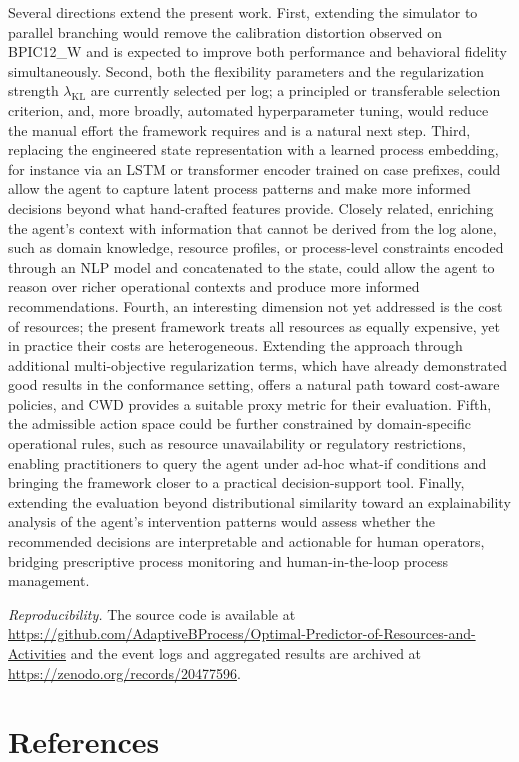 \documentclass[journal,onecolumn]{IEEEtran}
\begin{document}
Several directions extend the present work. First, extending the
simulator to parallel branching would remove the calibration
distortion observed on BPIC12\_W and is expected to improve both
performance and behavioral fidelity simultaneously. Second, both the
flexibility parameters and the regularization strength
$\lambda_{\text{KL}}$ are currently selected per log; a principled or
transferable selection criterion, and, more broadly, automated
hyperparameter tuning, would reduce the manual effort the framework
requires and is a natural next step. Third, replacing the engineered
state representation with a learned process embedding, for instance
via an LSTM or transformer encoder trained on case prefixes, could
allow the agent to capture latent process patterns and make more
informed decisions beyond what hand-crafted features provide. Closely
related, enriching the agent's context with information that cannot
be derived from the log alone, such as domain knowledge, resource
profiles, or process-level constraints encoded through an NLP model
and concatenated to the state, could allow the agent to reason over
richer operational contexts and produce more informed recommendations.
Fourth, an interesting dimension not yet addressed is the cost of
resources; the present framework treats all resources as equally
expensive, yet in practice their costs are heterogeneous. Extending
the approach through additional multi-objective regularization terms,
which have already demonstrated good results in the conformance
setting, offers a natural path toward cost-aware policies, and CWD
provides a suitable proxy metric for their evaluation. Fifth, the
admissible action space could be further constrained by
domain-specific operational rules, such as resource unavailability
or regulatory restrictions, enabling practitioners to query the agent
under ad-hoc what-if conditions and bringing the framework closer to
a practical decision-support tool. Finally, extending the evaluation
beyond distributional similarity toward an explainability analysis of
the agent's intervention patterns would assess whether the recommended
decisions are interpretable and actionable for human operators,
bridging prescriptive process monitoring and human-in-the-loop
process management.

\bigskip
\noindent\textit{Reproducibility.} The source code is available at
\url{https://github.com/AdaptiveBProcess/Optimal-Predictor-of-Resources-and-Activities}
and the event logs and aggregated results are archived at
\url{https://zenodo.org/records/20477596}.

\section*{References}
\label{sec:references}


\begingroup
\renewcommand{\section}[2]{}%
\small

\endgroup
\end{document}
